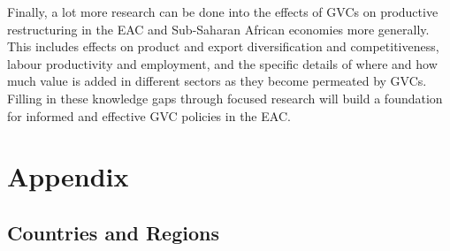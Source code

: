 \documentclass[a4paper]{article}
\begin{document}
Finally, a lot more research can be done into the effects of GVCs on productive restructuring in the EAC and Sub-Saharan African economies more generally. This includes effects on product and export diversification and competitiveness, labour productivity and employment, and the specific details of where and how much value is added in different sectors as they become permeated by GVCs. Filling in these knowledge gaps through focused research will build a foundation for informed and effective GVC policies in the EAC. 



\newpage




\section*{Appendix}

\subsection*{Countries and Regions}
\end{document}

